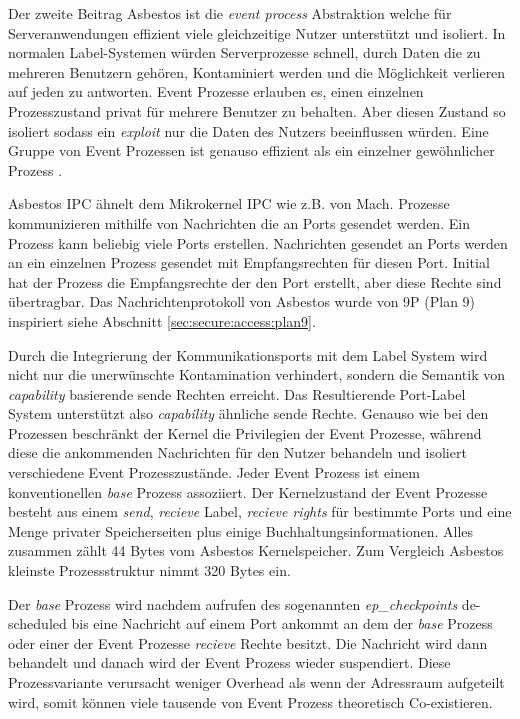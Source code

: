 \documentclass[german, 9pt,technote]{IEEEtran}
\begin{document}
      Der zweite Beitrag Asbestos ist die \textit{event process} Abstraktion welche f\"ur Serveranwendungen 
      effizient viele gleichzeitige Nutzer unterst\"utzt und isoliert.
      In normalen Label-Systemen w\"urden Serverprozesse schnell, durch Daten die zu mehreren Benutzern geh\"oren, Kontaminiert werden und die 
      M\"oglichkeit verlieren auf jeden zu antworten. Event Prozesse erlauben es, einen einzelnen Prozesszustand privat f\"ur mehrere Benutzer zu behalten.
      Aber diesen Zustand so isoliert sodass ein \textit{exploit} nur die Daten des Nutzers beeinflussen w\"urden.
      Eine Gruppe von Event Prozessen ist genauso effizient als ein einzelner gew\"ohnlicher Prozess \cite[S. 1]{inproc:asbestos}.
      
      Asbestos IPC \"ahnelt dem Mikrokernel IPC wie z.B. von Mach. Prozesse kommunizieren mithilfe von Nachrichten die an Ports gesendet werden. Ein Prozess kann
      beliebig viele Ports erstellen. Nachrichten gesendet an Ports werden an ein einzelnen Prozess gesendet mit Empfangsrechten f\"ur diesen Port. 
      Initial hat der Prozess
      die Empfangsrechte der den Port erstellt, aber diese Rechte sind \"ubertragbar. Das Nachrichtenprotokoll von Asbestos wurde von 9P (Plan 9) inspiriert
      siehe Abschnitt \ref{sec:secure:access:plan9}.      
      
      Durch die Integrierung der Kommunikationsports mit dem Label System wird nicht nur die unerw\"unschte Kontamination verhindert, sondern die Semantik von
      \textit{capability} basierende sende Rechten erreicht. Das Resultierende Port-Label System unterst\"utzt also \textit{capability} \"ahnliche sende Rechte.
      Genauso wie bei den Prozessen beschr\"ankt der Kernel die Privilegien der Event Prozesse, w\"ahrend diese die ankommenden Nachrichten f\"ur den Nutzer
      behandeln und isoliert verschiedene Event Prozesszust\"ande.
      Jeder Event Prozess ist einem konventionellen \textit{base} Prozess assoziiert. Der Kernelzustand der Event Prozesse besteht aus einem \textit{send}, 
      \textit{recieve} Label, \textit{recieve rights} f\"ur bestimmte Ports und eine Menge privater Speicherseiten plus einige Buchhaltungsinformationen.
      Alles zusammen z\"ahlt 44 Bytes vom Asbestos Kernelspeicher. Zum Vergleich Asbestos kleinste Prozessstruktur nimmt 320 Bytes ein. 
      
      Der \textit{base} Prozess wird nachdem aufrufen des sogenannten \textit{ep\_checkpoints} de-scheduled bis eine Nachricht auf einem Port ankommt 
      an dem der \textit{base} Prozess oder einer der Event Prozesse \textit{recieve} Rechte besitzt.
      Die Nachricht wird dann behandelt und danach wird der Event Prozess wieder suspendiert. Diese Prozessvariante verursacht weniger Overhead als wenn der
      Adressraum aufgeteilt wird, somit k\"onnen viele tausende von Event Prozess theoretisch Co-existieren.
      
\end{document}
